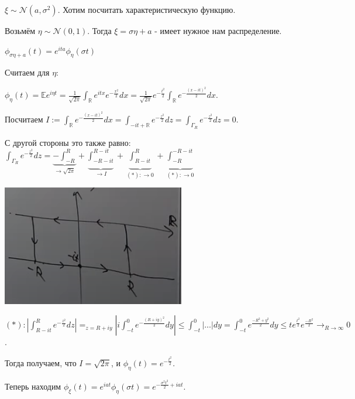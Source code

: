 \begin{example}
    $\xi \sim \mathcal{N}(a, \sigma^2)$. Хотим посчитать характеристическую функцию.

    Возьмём $\eta \sim \mathcal{N}(0, 1)$. Тогда $\xi = \sigma \eta + a$ - имеет нужное нам распределение.

    $\phi_{\sigma \eta + a}(t) = e^{ita} \phi_{\eta} (\sigma t)$

    Считаем для $\eta$:
    
    $\phi_{\eta}(t) = \mathbb{E} e^{i \eta t} = \frac{1}{\sqrt{2 \pi}} \int_{\mathbb{R}} e^{i t x} e^{-\frac{x^2}{2}} dx = \frac{1}{\sqrt{2 \pi}} e^{-\frac{t^2}{2}} \int_{\mathbb{R}} e^{- \frac{(x - it)^2}{2}} dx$.

    Посчитаем $I := \int_{\mathbb{R}} e^{-\frac{(x - it)^2}{2}} dx = \int_{-it + \mathbb{R}} e^{-\frac{z^2}{2}} dz = \int_{\Gamma_R} e^{-\frac{z^2}{2}} dz = 0$.

    С другой стороны это также равно: $\int_{\Gamma_R} e^{-\frac{z^2}{2}} dz = \underbrace{-\int_{-R}^{R}}_{\to \sqrt{2 \pi}} + \underbrace{\int_{-R - it}^{R - it}}_{\to I} + \underbrace{\int_{R - it}^{R}}_{(*): \to 0} + \underbrace{\int_{-R}^{-R - it}}_{(*): \to 0}$


    \begin{center}
        \includegraphics[width=8cm]{./assets/03-characteristic-funcs/complex-arbitrary-value-example-1.png}
    \end{center}

    $(*): \left| \int_{R - it}^{R} e^{-\frac{z^2}{2}} dz \right| =_{z = R + i y} \left| i \int_{-t}^{0} e^{- \frac{(R + iy)^2}{2}} dy \right| \leq \int_{-t}^{0} |\ldots|dy = \int_{-t}^{0} e^{\frac{-R^2 + y^2}{2}} dy \leq t e^{\frac{t^2}{2}} e^{\frac{-R^2}{2}} \rightarrow_{R \to \infty} 0$.


    Тогда получаем, что $I = \sqrt{2 \pi}$, и $\phi_{\eta}(t) = e^{-\frac{t^2}{2}}$.


    Теперь находим $\phi_{\xi}(t) = e^{iat} \phi_{\eta}(\sigma t) = e^{- \frac{\sigma^2 t^2}{2} + iat}$.
\end{example}

